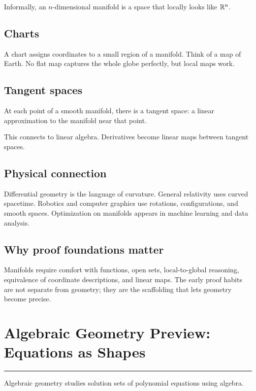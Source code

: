 \documentclass[12pt]{article}
\newcommand{\chapterline}{\vspace{0.4em}\hrule\vspace{0.8em}}
\begin{document}
\begin{definition}
Informally, an $n$-dimensional manifold is a space that locally looks like $\mathbb{R}^n$.
\end{definition}

\subsection{Charts}

A chart assigns coordinates to a small region of a manifold. Think of a map of Earth. No flat map captures the whole globe perfectly, but local maps work.

\subsection{Tangent spaces}

At each point of a smooth manifold, there is a tangent space: a linear approximation to the manifold near that point.

This connects to linear algebra. Derivatives become linear maps between tangent spaces.

\subsection{Physical connection}

Differential geometry is the language of curvature. General relativity uses curved spacetime. Robotics and computer graphics use rotations, configurations, and smooth spaces. Optimization on manifolds appears in machine learning and data analysis.

\subsection{Why proof foundations matter}

Manifolds require comfort with functions, open sets, local-to-global reasoning, equivalence of coordinate descriptions, and linear maps. The early proof habits are not separate from geometry; they are the scaffolding that lets geometry become precise.

\newpage
\section{Algebraic Geometry Preview: Equations as Shapes}
\chapterline

Algebraic geometry studies solution sets of polynomial equations using algebra.
\end{document}
